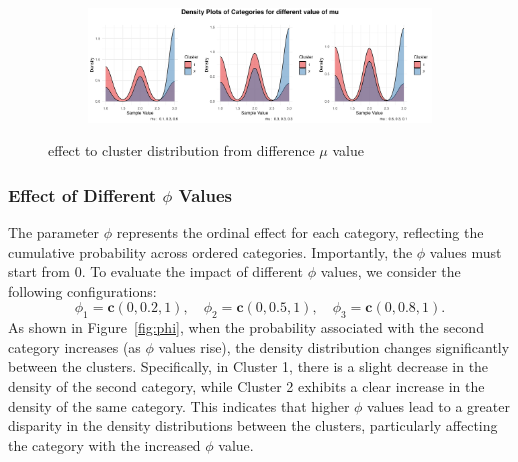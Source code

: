 \documentclass{article}
\begin{document}
\begin{figure}[h]
  \centering
  \begin{subfigure}{1.0\textwidth}
      \centering
      \includegraphics[width=\textwidth]{images/para_sim/mu.png}
  \end{subfigure}
  \caption{effect to cluster distribution from difference $\mu$ value}
  \label{fig:mu}
\end{figure}

\subsubsection*{Effect of Different $\phi$ Values}
The parameter $\phi$ represents the ordinal effect for each category, reflecting the cumulative probability across ordered categories. Importantly, the $\phi$ values must start from 0. To evaluate the impact of different $\phi$ values, we consider the following configurations:
\[
\phi_1 = \mathbf{c}(0, 0.2, 1), \quad \phi_2 = \mathbf{c}(0, 0.5, 1), \quad \phi_3 = \mathbf{c}(0, 0.8, 1).
\]
As shown in Figure~\ref{fig:phi}, when the probability associated with the second category increases (as $\phi$ values rise), the density distribution changes significantly between the clusters. Specifically, in Cluster 1, there is a slight decrease in the density of the second category, while Cluster 2 exhibits a clear increase in the density of the same category. This indicates that higher $\phi$ values lead to a greater disparity in the density distributions between the clusters, particularly affecting the category with the increased $\phi$ value.
\end{document}
